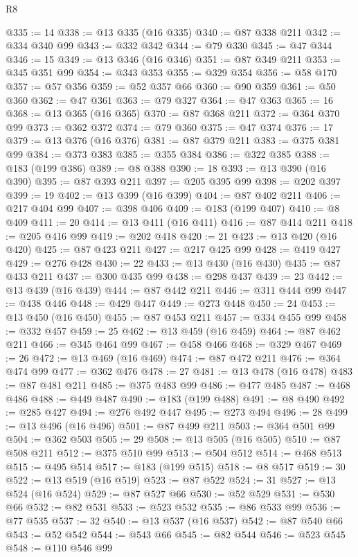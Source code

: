\begin{lexlean}{R8}
\begin{coremodule}
@335 := 14
@338 := @13 @335 (@16 @335)
@340 := @87 @338 @211
@342 := @334 @340 @99
@343 := @332 @342
@344 := @79 @330
@345 := @47 @344
@346 := 15
@349 := @13 @346 (@16 @346)
@351 := @87 @349 @211
@353 := @345 @351 @99
@354 := @343 @353
@355 := @329 @354
@356 := @58 @170
@357 := @57 @356
@359 := @52 @357 @66
@360 := @90 @359
@361 := @50 @360
@362 := @47 @361
@363 := @79 @327
@364 := @47 @363
@365 := 16
@368 := @13 @365 (@16 @365)
@370 := @87 @368 @211
@372 := @364 @370 @99
@373 := @362 @372
@374 := @79 @360
@375 := @47 @374
@376 := 17
@379 := @13 @376 (@16 @376)
@381 := @87 @379 @211
@383 := @375 @381 @99
@384 := @373 @383
@385 := @355 @384
@386 := @322 @385
@388 := @183 (@199 @386)
@389 := @8 @388
@390 := 18
@393 := @13 @390 (@16 @390)
@395 := @87 @393 @211
@397 := @205 @395 @99
@398 := @202 @397
@399 := 19
@402 := @13 @399 (@16 @399)
@404 := @87 @402 @211
@406 := @217 @404 @99
@407 := @398 @406
@409 := @183 (@199 @407)
@410 := @8 @409
@411 := 20
@414 := @13 @411 (@16 @411)
@416 := @87 @414 @211
@418 := @205 @416 @99
@419 := @202 @418
@420 := 21
@423 := @13 @420 (@16 @420)
@425 := @87 @423 @211
@427 := @217 @425 @99
@428 := @419 @427
@429 := @276 @428
@430 := 22
@433 := @13 @430 (@16 @430)
@435 := @87 @433 @211
@437 := @300 @435 @99
@438 := @298 @437
@439 := 23
@442 := @13 @439 (@16 @439)
@444 := @87 @442 @211
@446 := @311 @444 @99
@447 := @438 @446
@448 := @429 @447
@449 := @273 @448
@450 := 24
@453 := @13 @450 (@16 @450)
@455 := @87 @453 @211
@457 := @334 @455 @99
@458 := @332 @457
@459 := 25
@462 := @13 @459 (@16 @459)
@464 := @87 @462 @211
@466 := @345 @464 @99
@467 := @458 @466
@468 := @329 @467
@469 := 26
@472 := @13 @469 (@16 @469)
@474 := @87 @472 @211
@476 := @364 @474 @99
@477 := @362 @476
@478 := 27
@481 := @13 @478 (@16 @478)
@483 := @87 @481 @211
@485 := @375 @483 @99
@486 := @477 @485
@487 := @468 @486
@488 := @449 @487
@490 := @183 (@199 @488)
@491 := @8 @490
@492 := @285 @427
@494 := @276 @492 @447
@495 := @273 @494
@496 := 28
@499 := @13 @496 (@16 @496)
@501 := @87 @499 @211
@503 := @364 @501 @99
@504 := @362 @503
@505 := 29
@508 := @13 @505 (@16 @505)
@510 := @87 @508 @211
@512 := @375 @510 @99
@513 := @504 @512
@514 := @468 @513
@515 := @495 @514
@517 := @183 (@199 @515)
@518 := @8 @517
@519 := 30
@522 := @13 @519 (@16 @519)
@523 := @87 @522
@524 := 31
@527 := @13 @524 (@16 @524)
@529 := @87 @527 @66
@530 := @52 @529
@531 := @530 @66
@532 := @82 @531
@533 := @523 @532
@535 := @86 @533 @99
@536 := @77 @535
@537 := 32
@540 := @13 @537 (@16 @537)
@542 := @87 @540 @66
@543 := @52 @542
@544 := @543 @66
@545 := @82 @544
@546 := @523 @545
@548 := @110 @546 @99

\end{coremodule}
\end{lexlean}
